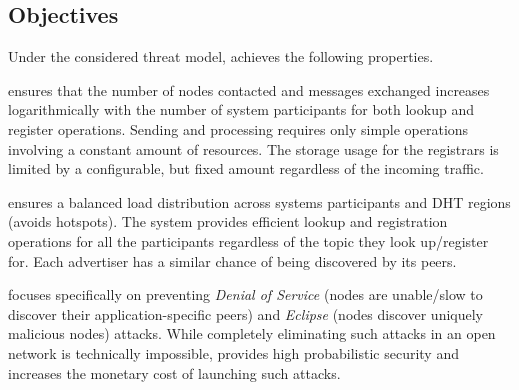 \subsection{Objectives}
Under the considered threat model, \sysname achieves the following properties.

 \sysname ensures that the number of nodes contacted and messages exchanged increases logarithmically with the number of system participants for both lookup and register operations. Sending and processing requires only simple operations involving a constant amount of resources. The storage usage for the registrars is limited by a configurable, but fixed amount regardless of the incoming traffic. 

 \sysname ensures a balanced load distribution across systems participants and DHT regions (\ie avoids hotspots). The system provides efficient lookup and registration operations for all the participants regardless of the topic they look up/register for. Each advertiser has a similar chance of being discovered by its peers. 

 \sysname focuses specifically on preventing \emph{Denial of Service} (nodes are unable/slow to discover their application-specific peers) and \emph{Eclipse} (nodes discover uniquely malicious nodes) attacks. While completely eliminating such attacks in an open network is technically impossible, \sysname provides high probabilistic security  and increases the monetary cost of launching such attacks. 
